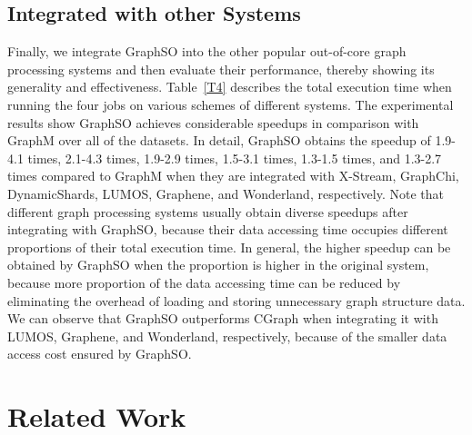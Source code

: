 \documentclass[10pt,journal,compsoc]{IEEEtran}
\begin{document}
\subsection{Integrated with other Systems}\label{section:Others}
\vspace{-2pt}
Finally, we integrate GraphSO into the other popular out-of-core graph processing systems and then evaluate their performance, thereby showing its generality and effectiveness.
Table~\ref{T4} describes the total execution time when running the four jobs on various schemes of different systems. The experimental results show GraphSO achieves considerable speedups in comparison with GraphM over all of the datasets. In detail, GraphSO obtains the speedup of 1.9-4.1 times, 2.1-4.3 times, 1.9-2.9 times, 1.5-3.1 times, 1.3-1.5 times, and 1.3-2.7 times compared to GraphM when they are integrated with X-Stream, GraphChi, DynamicShards, LUMOS, Graphene, and Wonderland, respectively. Note that different graph processing systems usually obtain diverse speedups after integrating with GraphSO, because their data accessing time occupies different proportions of their total execution time. In general, the higher speedup can be obtained by GraphSO when the proportion is higher in the original system, because more proportion of the data accessing time can be reduced by eliminating the overhead of loading and storing unnecessary graph structure data.
We can observe that GraphSO outperforms CGraph when integrating it with LUMOS, Graphene, and Wonderland, respectively, because of the smaller data access cost ensured by GraphSO.


\vspace{-8pt}
\section{Related Work}\label{sec:5}
\end{document}
